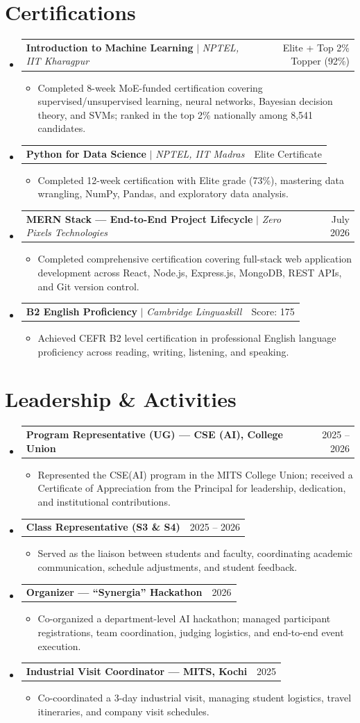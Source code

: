 \documentclass[a4paper,10pt]{article}
\makeatletter
\newcommand{\resumeItem}[1]{
  \item\small{
    {#1 \vspace{-2pt}}
  }
}
\newcommand{\resumeProjectHeading}[2]{
    \item
    \begin{tabular*}{0.97\textwidth}{l@{\extracolsep{\fill}}r}
      \small#1 & #2 \\
    \end{tabular*}\vspace{-7pt}
}
\newcommand{\resumeSubHeadingListStart}{\begin{itemize}[leftmargin=0.15in, label={}]}
\newcommand{\resumeSubHeadingListEnd}{\end{itemize}}
\newcommand{\resumeItemListStart}{\begin{itemize}}
\newcommand{\resumeItemListEnd}{\end{itemize}\vspace{-5pt}}
\makeatother
\begin{document}
\section{Certifications}
  \resumeSubHeadingListStart
    \resumeProjectHeading{\textbf{Introduction to Machine Learning} $|$ \emph{NPTEL, IIT Kharagpur}}{Elite + Top 2\% Topper (92\%)}
    \resumeItemListStart
      \resumeItem{Completed 8-week MoE-funded certification covering supervised/unsupervised learning, neural networks, Bayesian decision theory, and SVMs; ranked in the top 2\% nationally among 8,541 candidates.}
    \resumeItemListEnd
    \resumeProjectHeading{\textbf{Python for Data Science} $|$ \emph{NPTEL, IIT Madras}}{Elite Certificate}
    \resumeItemListStart
      \resumeItem{Completed 12-week certification with Elite grade (73\%), mastering data wrangling, NumPy, Pandas, and exploratory data analysis.}
    \resumeItemListEnd
    \resumeProjectHeading{\textbf{MERN Stack --- End-to-End Project Lifecycle} $|$ \emph{Zero Pixels Technologies}}{July 2026}
    \resumeItemListStart
      \resumeItem{Completed comprehensive certification covering full-stack web application development across React, Node.js, Express.js, MongoDB, REST APIs, and Git version control.}
    \resumeItemListEnd
    \resumeProjectHeading{\textbf{B2 English Proficiency} $|$ \emph{Cambridge Linguaskill}}{Score: 175}
    \resumeItemListStart
      \resumeItem{Achieved CEFR B2 level certification in professional English language proficiency across reading, writing, listening, and speaking.}
    \resumeItemListEnd
  \resumeSubHeadingListEnd


\section{Leadership \& Activities}
  \resumeSubHeadingListStart
    \resumeProjectHeading{\textbf{Program Representative (UG) --- CSE (AI), College Union}}{2025 -- 2026}
    \resumeItemListStart
      \resumeItem{Represented the CSE(AI) program in the MITS College Union; received a Certificate of Appreciation from the Principal for leadership, dedication, and institutional contributions.}
    \resumeItemListEnd
    \resumeProjectHeading{\textbf{Class Representative (S3 \& S4)}}{2025 -- 2026}
    \resumeItemListStart
      \resumeItem{Served as the liaison between students and faculty, coordinating academic communication, schedule adjustments, and student feedback.}
    \resumeItemListEnd
    \resumeProjectHeading{\textbf{Organizer --- ``Synergia'' Hackathon}}{2026}
    \resumeItemListStart
      \resumeItem{Co-organized a department-level AI hackathon; managed participant registrations, team coordination, judging logistics, and end-to-end event execution.}
    \resumeItemListEnd
    \resumeProjectHeading{\textbf{Industrial Visit Coordinator --- MITS, Kochi}}{2025}
    \resumeItemListStart
      \resumeItem{Co-coordinated a 3-day industrial visit, managing student logistics, travel itineraries, and company visit schedules.}
    \resumeItemListEnd
  \resumeSubHeadingListEnd
\end{document}
